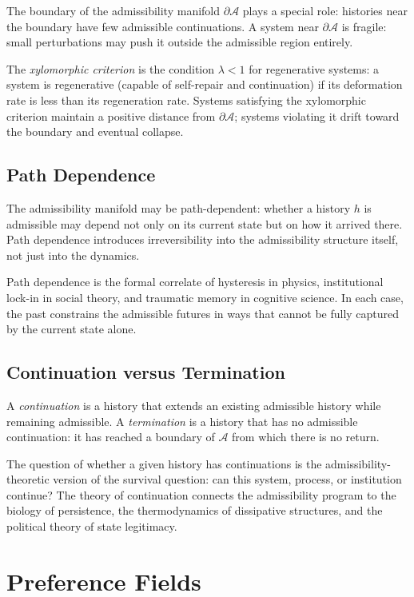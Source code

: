 \documentclass[12pt,a4paper]{book}
\theoremstyle{remark}
\theoremstyle{definition}
\begin{document}
The boundary of the admissibility manifold $\partial\mathcal{A}$ plays
a special role: histories near the boundary have few admissible
continuations. A system near $\partial\mathcal{A}$ is fragile: small
perturbations may push it outside the admissible region entirely.

The \emph{xylomorphic criterion} is the condition $\lambda < 1$ for
regenerative systems: a system is regenerative (capable of self-repair
and continuation) if its deformation rate is less than its regeneration
rate. Systems satisfying the xylomorphic criterion maintain a positive
distance from $\partial\mathcal{A}$; systems violating it drift toward
the boundary and eventual collapse.

\section{Path Dependence}

The admissibility manifold may be path-dependent: whether a history $h$
is admissible may depend not only on its current state but on how it
arrived there. Path dependence introduces irreversibility into the
admissibility structure itself, not just into the dynamics.

Path dependence is the formal correlate of hysteresis in physics,
institutional lock-in in social theory, and traumatic memory in
cognitive science. In each case, the past constrains the admissible
futures in ways that cannot be fully captured by the current state alone.

\section{Continuation versus Termination}

A \emph{continuation} is a history that extends an existing admissible
history while remaining admissible. A \emph{termination} is a history
that has no admissible continuation: it has reached a boundary of
$\mathcal{A}$ from which there is no return.

The question of whether a given history has continuations is the
admissibility-theoretic version of the survival question: can this
system, process, or institution continue? The theory of continuation
connects the admissibility program to the biology of persistence, the
thermodynamics of dissipative structures, and the political theory of
state legitimacy.

\chapter{Preference Fields}
\end{document}
